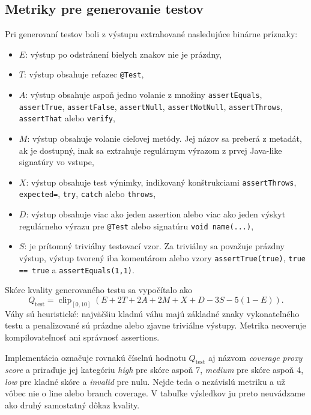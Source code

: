 \documentclass[11pt,a4paper]{article}
\begin{document}
\subsection{Metriky pre generovanie testov}

Pri generovaní testov boli z výstupu extrahované nasledujúce binárne príznaky:
\begin{itemize}
\item $E$: výstup po odstránení bielych znakov nie je prázdny,
\item $T$: výstup obsahuje reťazec \texttt{@Test},
\item $A$: výstup obsahuje aspoň jedno volanie z množiny
\texttt{assertEquals}, \texttt{assertTrue}, \texttt{assertFalse},
\texttt{assertNull}, \texttt{assertNotNull}, \texttt{assertThrows},
\texttt{assertThat} alebo \texttt{verify},
\item $M$: výstup obsahuje volanie cieľovej metódy. Jej názov sa preberá z
metadát, ak je dostupný, inak sa extrahuje regulárnym výrazom z prvej
Java-like signatúry vo vstupe,
\item $X$: výstup obsahuje test výnimky, indikovaný konštrukciami
\texttt{assertThrows}, \texttt{expected=}, \texttt{try}, \texttt{catch}
alebo \texttt{throws},
\item $D$: výstup obsahuje viac ako jeden assertion alebo viac ako jeden
výskyt regulárneho výrazu pre \texttt{@Test} alebo signatúru
\texttt{void name(...)},
\item $S$: je prítomný triviálny testovací vzor. Za triviálny sa považuje
prázdny výstup, výstup tvorený iba komentárom alebo vzory
\texttt{assertTrue(true)}, \texttt{true == true} a
\texttt{assertEquals(1,1)}.
\end{itemize}

Skóre kvality generovaného testu sa vypočítalo ako
\begin{equation}
Q_{\mathrm{test}} =
\operatorname{clip}_{[0,10]}
\left(E + 2T + 2A + 2M + X + D - 3S - 5(1-E)\right).
\end{equation}
Váhy sú heuristické: najväčšiu kladnú váhu majú základné znaky vykonateľného
testu a penalizované sú prázdne alebo zjavne triviálne výstupy. Metrika
neoveruje kompilovateľnosť ani správnosť assertions.

Implementácia označuje rovnakú číselnú hodnotu $Q_{\mathrm{test}}$ aj názvom
\textit{coverage proxy score} a priraďuje jej kategóriu
\textit{high} pre skóre aspoň 7, \textit{medium} pre skóre aspoň 4,
\textit{low} pre kladné skóre a \textit{invalid} pre nulu. Nejde teda o
nezávislú metriku a už vôbec nie o line alebo branch coverage. V tabuľke
výsledkov ju preto neuvádzame ako druhý samostatný dôkaz kvality.
\end{document}
